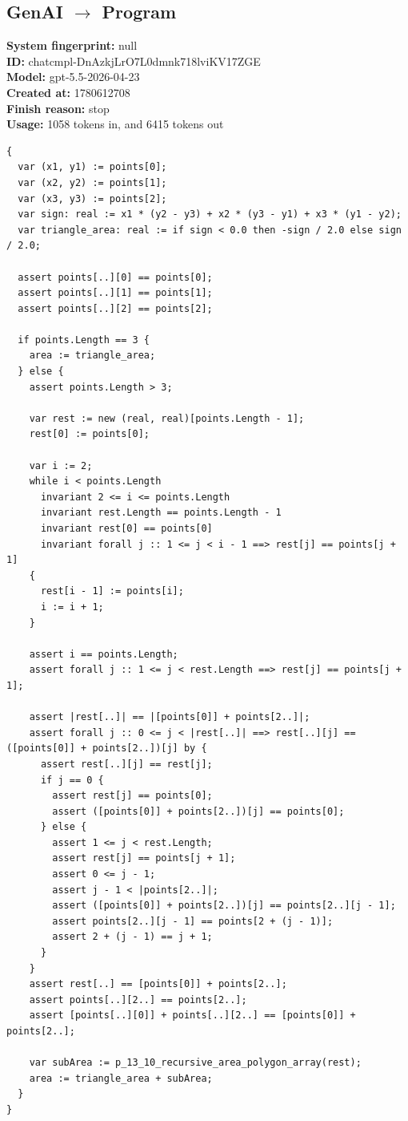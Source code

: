 \documentclass{article}
\begin{document}
\subsection*{GenAI $\rightarrow$ Program}
\textbf{System fingerprint: }null
\\\textbf{ID: }chatcmpl-DnAzkjLrO7L0dmnk718lviKV17ZGE
\\\textbf{Model: }gpt-5.5-2026-04-23
\\\textbf{Created at: }1780612708
\\\textbf{Finish reason: }stop
\\\textbf{Usage: }1058 tokens in, and 6415 tokens out
\begin{lstlisting}
{
  var (x1, y1) := points[0];
  var (x2, y2) := points[1];
  var (x3, y3) := points[2];
  var sign: real := x1 * (y2 - y3) + x2 * (y3 - y1) + x3 * (y1 - y2);
  var triangle_area: real := if sign < 0.0 then -sign / 2.0 else sign / 2.0;

  assert points[..][0] == points[0];
  assert points[..][1] == points[1];
  assert points[..][2] == points[2];

  if points.Length == 3 {
    area := triangle_area;
  } else {
    assert points.Length > 3;

    var rest := new (real, real)[points.Length - 1];
    rest[0] := points[0];

    var i := 2;
    while i < points.Length
      invariant 2 <= i <= points.Length
      invariant rest.Length == points.Length - 1
      invariant rest[0] == points[0]
      invariant forall j :: 1 <= j < i - 1 ==> rest[j] == points[j + 1]
    {
      rest[i - 1] := points[i];
      i := i + 1;
    }

    assert i == points.Length;
    assert forall j :: 1 <= j < rest.Length ==> rest[j] == points[j + 1];

    assert |rest[..]| == |[points[0]] + points[2..]|;
    assert forall j :: 0 <= j < |rest[..]| ==> rest[..][j] == ([points[0]] + points[2..])[j] by {
      assert rest[..][j] == rest[j];
      if j == 0 {
        assert rest[j] == points[0];
        assert ([points[0]] + points[2..])[j] == points[0];
      } else {
        assert 1 <= j < rest.Length;
        assert rest[j] == points[j + 1];
        assert 0 <= j - 1;
        assert j - 1 < |points[2..]|;
        assert ([points[0]] + points[2..])[j] == points[2..][j - 1];
        assert points[2..][j - 1] == points[2 + (j - 1)];
        assert 2 + (j - 1) == j + 1;
      }
    }
    assert rest[..] == [points[0]] + points[2..];
    assert points[..][2..] == points[2..];
    assert [points[..][0]] + points[..][2..] == [points[0]] + points[2..];

    var subArea := p_13_10_recursive_area_polygon_array(rest);
    area := triangle_area + subArea;
  }
}
\end{lstlisting}
\end{document}
